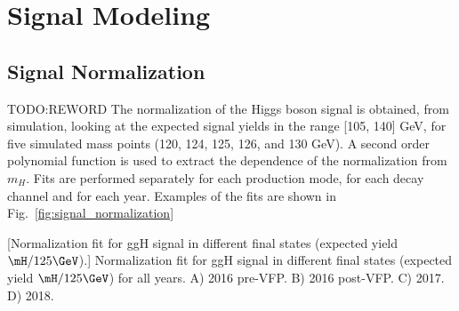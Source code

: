 \section{Signal Modeling}
\label{sec:signal_model}

\subsection{Signal Normalization}
\label{sec:SignalNormalization}
TODO:REWORD The normalization of the Higgs boson signal is obtained, from simulation, 
looking at the expected signal yields in the range [105, 140] GeV, 
for five simulated mass points (120, 124, 125, 126, and 130 GeV).
A second order polynomial function is used to extract the dependence of the normalization from $m_{H}$.
Fits are performed separately for each production mode, for each decay channel and for each year. 
Examples of the fits are shown in Fig.~\ref{fig:signal_normalization}
\begin{multiFigure}
    \centering
        [Normalization fit for ggH signal in different final states (expected yield \vs $\mH / 125\GeV$).]
        {Normalization fit for ggH signal in different final states (expected yield \vs $\mH / 125\GeV$) for all years.
        A) 2016 pre-VFP.
        B) 2016 post-VFP.
        C) 2017.
        D) 2018.
        }
    \label{fig:signal_normalization}
\end{multiFigure}
%
